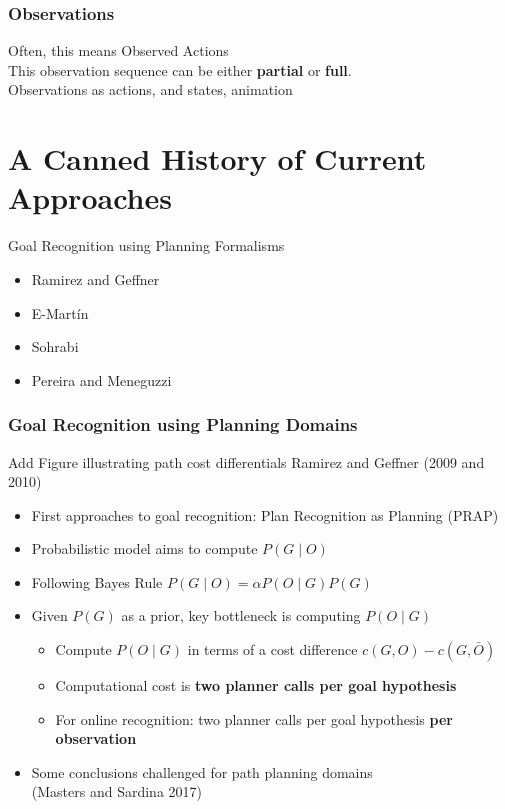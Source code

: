 \documentclass[usenames,dvipsnames]{beamer}
\newcommand{\todo}[1]{ {\color{red} #1} }
\begin{document}
	\begin{frame}[c]\frametitle{Observations}
		Often, this means Observed Actions\\
        This observation sequence can be either \textbf{partial} or \textbf{full}.\\
            \todo{Observations as actions, and states, animation}
	\end{frame}
\fi


\section{A Canned History of Current Approaches}

\begin{frame}[c]{Goal Recognition using Planning Formalisms}
	\begin{itemize}
		\item Ramirez and Geffner
		\item E-Martín
		\item Sohrabi
		\item Pereira and Meneguzzi
	\end{itemize}
\end{frame}

\begin{frame}[c]\frametitle{Goal Recognition using Planning Domains}
	{\color{red} Add Figure illustrating path cost differentials}
	Ramirez and Geffner (2009 and 2010)
	\begin{itemize}
		\item First approaches to goal recognition: Plan Recognition as Planning (PRAP)
		\item Probabilistic model aims to compute $P(G \mid O)$
		\item Following Bayes Rule $P(G \mid O) = \alpha P(O \mid G) P(G)$
		\item Given $P(G)$ as a prior, key bottleneck is computing $P(O \mid G)$
		\begin{itemize}
			\item Compute $P(O \mid G)$ in terms of a cost difference $c(G,O) - c(G,\bar{O})$
			\item Computational cost is \textbf{two planner calls per goal hypothesis}
			\item For online recognition: two planner calls per goal hypothesis \textbf{per observation}
		\end{itemize}
		\item Some conclusions challenged for path planning domains\\ (Masters and Sardina 2017)
	\end{itemize}
\end{frame}
\end{document}
